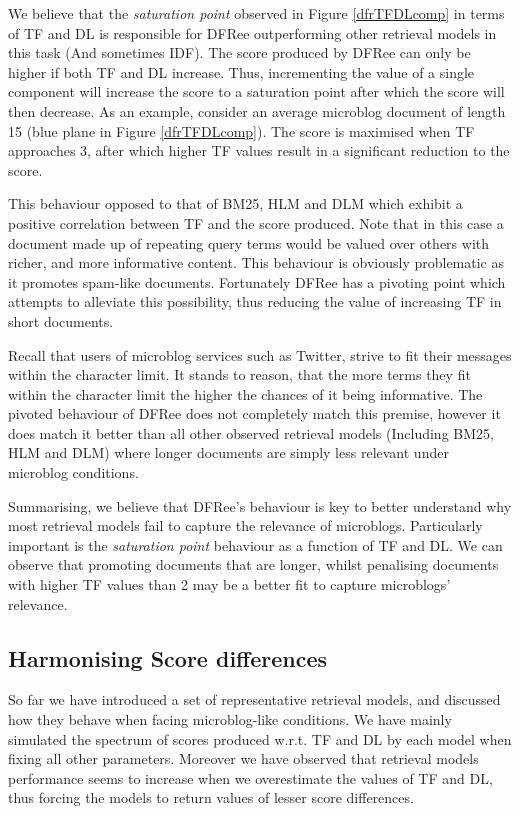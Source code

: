 We believe that the \textit{saturation point} observed in Figure \ref{dfrTFDLcomp} in terms of TF and DL is responsible for DFRee outperforming other retrieval models in this task (And sometimes IDF). The score produced by DFRee can only be higher if both TF and DL increase. Thus, incrementing the value of a single component will increase the score to a saturation point after which the score will then decrease. As an example, consider an average microblog document of length 15 (blue plane in Figure \ref{dfrTFDLcomp}). The score is maximised when TF approaches 3, after which higher TF values result in a significant reduction to the score.

This behaviour opposed to that of BM25, HLM and DLM which exhibit a positive correlation between TF and the score produced. Note that in this case a document made up of repeating query terms would be valued over others with richer, and more informative content. This behaviour is obviously problematic as it promotes spam-like documents. Fortunately DFRee has a pivoting point which attempts to alleviate this possibility, thus reducing the value of increasing TF in short documents.

Recall that users of microblog services such as Twitter, strive to fit their messages within the character limit. It stands to reason, that the more terms they fit within the character limit the higher the chances of it being informative. The pivoted behaviour of DFRee does not completely match this premise, however it does match it better than all other observed retrieval models (Including BM25, HLM and DLM) where longer documents are simply less relevant under microblog conditions.

Summarising, we believe that DFRee's behaviour is key to better understand why most retrieval models fail to capture the relevance of microblogs. Particularly important is the \textit{saturation point} behaviour as a function of TF and DL. We can observe that promoting documents that are longer, whilst penalising documents with higher TF values than 2 may be a better fit to capture microblogs' relevance.

\subsection{Harmonising Score differences}
So far we have introduced a set of representative retrieval models, and discussed how they behave when facing microblog-like conditions. We have mainly simulated the spectrum of scores produced w.r.t. TF and DL by each model when fixing all other parameters. Moreover we have observed that retrieval models performance seems to increase when we overestimate the values of TF and DL, thus forcing the models to return values of lesser score differences.


